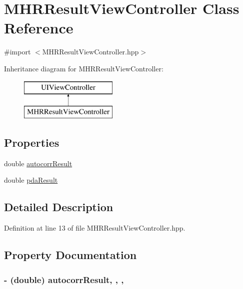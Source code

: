 \hypertarget{interface_m_h_r_result_view_controller}{\section{M\+H\+R\+Result\+View\+Controller Class Reference}
\label{interface_m_h_r_result_view_controller}
}


{\ttfamily \#import $<$M\+H\+R\+Result\+View\+Controller.\+hpp$>$}

Inheritance diagram for M\+H\+R\+Result\+View\+Controller\+:\begin{figure}[H]
\begin{center}
\leavevmode
\includegraphics[height=2.000000cm]{interface_m_h_r_result_view_controller}
\end{center}
\end{figure}
\subsection*{Properties}
\begin{DoxyCompactItemize}
\item 
double \hyperlink{interface_m_h_r_result_view_controller_ad2cc92ee5ee811f8df6b04883f090096}{autocorr\+Result}
\item 
double \hyperlink{interface_m_h_r_result_view_controller_ae0daab10c086e438477f71f59fa0de37}{pda\+Result}
\end{DoxyCompactItemize}


\subsection{Detailed Description}


Definition at line 13 of file M\+H\+R\+Result\+View\+Controller.\+hpp.



\subsection{Property Documentation}
\hypertarget{interface_m_h_r_result_view_controller_ad2cc92ee5ee811f8df6b04883f090096}{
\subsubsection[{autocorr\+Result}]{\setlength{\rightskip}{0pt plus 5cm}-\/ (double) autocorr\+Result\hspace{0.3cm}{\ttfamily [read]}, {\ttfamily [write]}, {\ttfamily [nonatomic]}, {\ttfamily [assign]}}}\label{interface_m_h_r_result_view_controller_ad2cc92ee5ee811f8df6b04883f090096}


